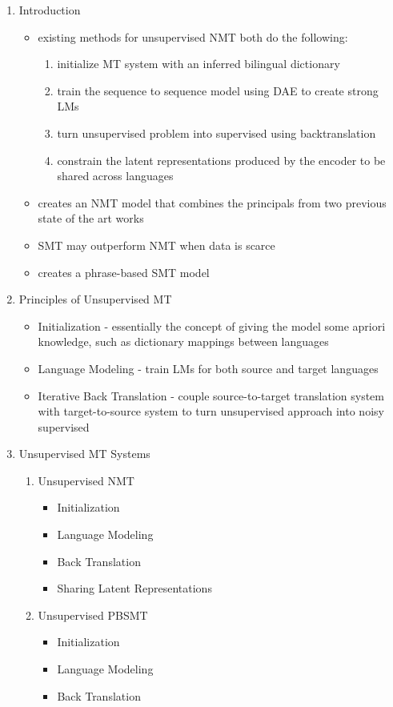 \documentclass{article}
\begin{document}
\begin{enumerate}
	\item Introduction
	\begin{itemize}
		\item existing methods for unsupervised NMT both do the following: 
		\begin{enumerate}
			\item initialize MT system with an inferred bilingual dictionary
			\item train the sequence to sequence model using DAE to create strong LMs
			\item turn unsupervised problem into supervised using backtranslation
			\item constrain the latent representations produced by the encoder to be shared across languages
		\end{enumerate}
		\item creates an NMT model that combines the principals from two previous state of the art works
		\item SMT may outperform NMT when data is scarce
		\item creates a phrase-based SMT model
	\end{itemize}
	\item Principles of Unsupervised MT
	\begin{itemize}
		\item Initialization - essentially the concept of giving the model some apriori knowledge, such as dictionary mappings between languages
		\item Language Modeling - train LMs for both source and target languages
		\item Iterative Back Translation - couple source-to-target translation system with target-to-source system to turn unsupervised approach into noisy supervised
	\end{itemize}
	\item Unsupervised MT Systems
	\begin{enumerate}
		\item Unsupervised NMT
		\begin{itemize}
			\item Initialization
			\item Language Modeling
			\item Back Translation
			\item Sharing Latent Representations
		\end{itemize}
		\item Unsupervised PBSMT
		\begin{itemize}
			\item Initialization
			\item Language Modeling
			\item Back Translation
		\end{itemize}
	\end{enumerate}
\end{enumerate}
\end{document}
